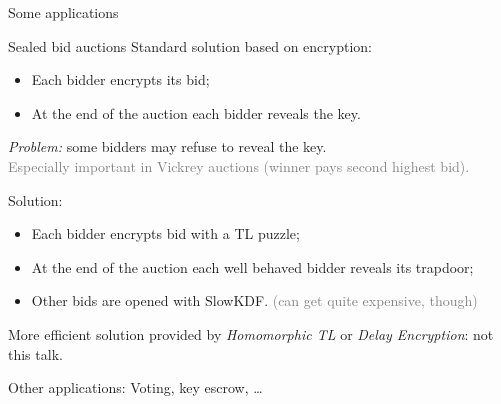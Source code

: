 \documentclass[aspectratio=169]{beamer}
\begin{document}
\begin{frame}{Some applications}
  \begin{block}{Sealed bid auctions}
    Standard solution based on encryption:
    \begin{itemize}
    \item Each bidder encrypts its bid;
    \item At the end of the auction each bidder reveals the key.
    \end{itemize}

    \emph{Problem:} some bidders may refuse to reveal the key.\\
    \textcolor{gray}{Especially important in Vickrey auctions (winner
      pays second highest bid).}

    \bigskip\pause
    Solution:
    \begin{itemize}
    \item Each bidder encrypts bid with a TL puzzle;
    \item At the end of the auction each well behaved bidder reveals
      its trapdoor;
    \item Other bids are opened with SlowKDF. \textcolor{gray}{(can
        get quite expensive, though)}
    \end{itemize}
    
    \smallskip\pause More efficient solution provided by
    \emph{Homomorphic TL} or \emph{Delay Encryption}: not this talk.
  \end{block}

  \pause
  Other applications: Voting, key escrow, \dots
\end{frame}

\end{document}
